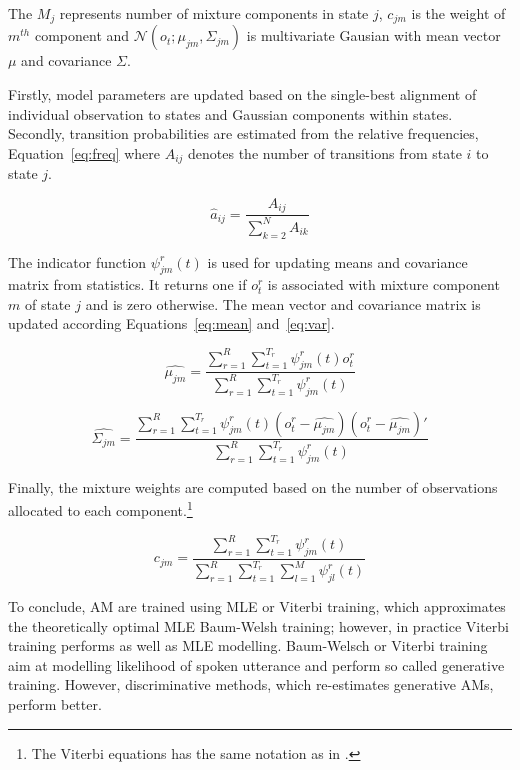 The $M_j$ represents number of mixture components in state $j$, $c_{jm}$ is the weight of $m^{th}$ component and $\mathcal{N}(o_t; \mu_{jm}, \Sigma_{jm})$
is multivariate Gausian with mean vector $\mu$ and covariance $\Sigma$.

Firstly, model parameters are updated based on the single-best alignment of individual observation to states and Gaussian components within states.
Secondly, transition probabilities are estimated from the relative frequencies, Equation~\ref{eq:freq} where $A_{ij}$ denotes the number of transitions from state $i$ to state $j$.

\begin{equation}\label{eq:freq}
    \hat{a}_{ij} = \frac{A_{ij}}{\sum_{k=2}^{N}{A_{ik}}}
\end{equation}

The indicator function $\psi^r_{jm}(t)$ is used for updating means and covariance matrix from statistics.
It returns one if $o^r_t$ is associated with mixture component $m$ of state $j$ and is zero otherwise.
The mean vector and covariance matrix is updated according Equations~\ref{eq:mean} and~\ref{eq:var}.

\begin{equation}\label{eq:mean}
    \hat{\mu_{jm}} = \frac{\sum_{r=1}^{R}{\sum_{t=1}^{T_r}{\psi^r_{jm}(t)o^r_t}}}  {\sum_{r=1}^{R}{\sum_{t=1}^{T_r}{\psi^r_{jm}(t)}}}
\end{equation}

\begin{equation}\label{eq:var}
    \hat{\Sigma_{jm}} = \frac{\sum_{r=1}^{R}{\sum_{t=1}^{T_r}{\psi^r_{jm}(t)(o^r_t - \hat{\mu_{jm}})(o^r_t - \hat{\mu_{jm}})'}}}  {\sum_{r=1}^{R}{\sum_{t=1}^{T_r}{\psi^r_{jm}(t)}}}
\end{equation}

Finally, the mixture weights are computed based on the number of observations allocated to each component.\footnote{The Viterbi equations has the same notation as in \cite{buthpitiya2012parallel}.}

\begin{equation}\label{eq:weights}
    c_{jm} = \frac{\sum_{r=1}^{R}{\sum_{t=1}^{T_r}{\psi^r_{jm}(t)}}} {\sum_{r=1}^{R}{\sum_{t=1}^{T_r}\sum_{l=1}^{M}{\psi^r_{jl}(t)}}}
\end{equation}


To conclude, \ac{AM} are trained using \ac{MLE} or Viterbi training, which approximates the theoretically optimal \ac{MLE} Baum-Welsh training; however, in practice Viterbi training performs as well as \ac{MLE} modelling.
Baum-Welsch or Viterbi training aim at modelling likelihood of spoken utterance and perform so called generative training.
However, discriminative methods, which re-estimates generative \acp{AM}, perform better.

